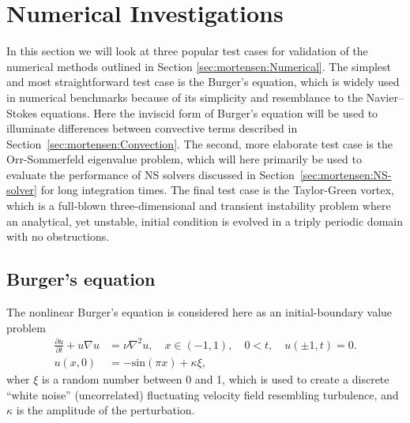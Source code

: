 \section{Numerical Investigations}
\label{sec:mortensen:testcases}
In this section we will look at three popular test cases for validation of the numerical methods outlined in Section \ref{sec:mortensen:Numerical}. The simplest and most straightforward test case is the Burger's equation, which is widely used in numerical benchmarks because of its simplicity and resemblance to the Navier--Stokes equations. Here the inviscid form of Burger's equation will be used to illuminate differences between convective terms described in Section~\ref{sec:mortensen:Convection}. The second, more elaborate test case is the Orr-Sommerfeld eigenvalue problem, which will here primarily be used to evaluate the performance of NS solvers discussed in Section~\ref{sec:mortensen:NS-solver} for long integration times. The final test case is the Taylor-Green vortex, which is a full-blown three-dimensional and transient instability problem where an analytical, yet unstable, initial condition is evolved in a triply periodic domain with no obstructions.

\subsection{Burger's equation}
\label{sec:mortensen:burgers}
The nonlinear Burger's equation is considered here as an initial-boundary value problem
\begin{align}
 \frac{\partial u}{\partial t}+u\nabla u &= \nu \nabla^2 u, \quad x \in (-1,1), \quad 0<t, \quad u(\pm 1,t)=0. \\
 u(x,0) &=-\text{sin}(\pi x)+\kappa \xi,
\label{eq:mortensen:burgers}
\end{align}
wher $\xi$ is a random number between 0 and 1, which is used to create a 
discrete ``white noise'' (uncorrelated) fluctuating velocity field resembling turbulence, and $\kappa$ is the amplitude of the perturbation. %

